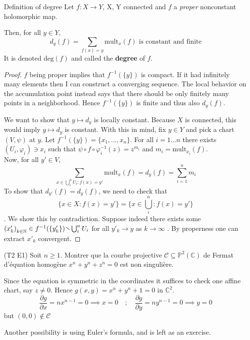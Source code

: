 \begin{theorem}{Definition of degree}
    Let \(f : X \to Y\), X, Y connected and \(f\) a \emph{proper} nonconstant
    holomorphic map.

    Then, for all \(y \in Y\),
    \[
      d_y{(f)} = \sum_{f{(x)} = y} \mathrm{mult}_x{(f)} \text{ is constant and
      finite}
    \]
    It is denoted \(\mathrm{deg}{(f)}\) and called the \textbf{degree} of \(f\).
\end{theorem}

\begin{proof}{}
    \(f\) being proper implies that
    \(f^{-1}{(\{y\} )}\) is compact. If it had infinitely many elements then I
    can construct a converging sequence. The local behavior on the accumulation
    point instead says that there should be only finitely many points in a
    neighborhood. Hence \(f^{-1}{(\{y\} )}\) is finite and thus also
    \(d_y{(f)}\).

    We want to show that \(y \mapsto d_y\) is locally constant. Because \(X\) is
    connected, this would imply \(y \mapsto d_y\) is constant. With this in
    mind, fix \(y \in Y\) and pick a chart \({(V, \psi)}\) at \(y\). Let
    \(f^{-1}{(\{y\} )} = \{x_{1}, \dots, x_{n}\} \). For all \(i = 1\dots n\)
    there exists \({(U_{i}, \varphi_{i})} \ni x_{i}\) such that \(\psi \circ f
    \circ \varphi_{i}^{-1}{(z)} = z^{m_{i}}\) and \(m_{i} =
    \mathrm{mult}_{x_{i}} {(f)}\). \\
    Now, for all \(y' \in V\),
    \[
      \sum_{x \in \bigcup_{i}^{n} U_{i} : f{(x)} = y'} \mathrm{mult}_x {(f)} = d_y{(f)} =
      \sum_{i=1}^{n} m_{i} 
    \]
    To show that \(d_{y'} {(f)} = d_y{(f)}\), we need to check that \[\{x \in X
        : f{(x)} = y'\} = \{x \in \bigcup_{i} ^{n} : f{(x)} = y'\} \]. We show
        this by contradiction. Suppose indeed there exists some \({(x'_k)}_{k
        \in \mathbb{N}} \in 
        f^{-1}{(\{y'_k\} )} \sminus \bigcup_{i} ^{n} U_{i} \) for all \(y'_k \to
        y\) as \(k\to \infty\) . By properness one
        can extract \(x'_k\) convergent.



\end{proof}

\begin{eser}{(T2 E1)}
    Soit \(n\ge 1\). Montrer que la courbe projective \(\mathcal{C} \subseteq
    \mathbb{P}^2{(\mathbb{C})} \) de Fermat d'équation homogène \(x^{n} + y^{n}
    + z^{n} = 0\) est non singulière.

    \tcblower

    Since the equation is symmetric in the coordinates it suffices to check one
    affine chart, say \(z \neq 0\). Hence \(g{(x, y)} = x^{n} + y^{n} + 1 = 0\) in
    \(\mathbb{C}^2\).
    \[
      \frac{\partial g}{\partial x} = n x^{n-1} = 0 \implies x = 0 \quad ; \quad
      \frac{\partial g}{\partial y} = n y^{n-1} = 0 \implies y = 0
    \]
    but \({(0, 0)} \not\in  \mathcal{C}\) 


    Another possibility is using Euler's formula, and is left as an exercise.
\end{eser}


